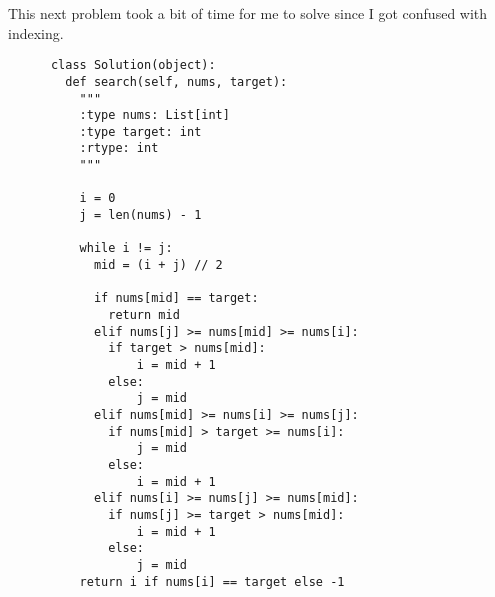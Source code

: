 \documentclass{article}
\begin{document}
  \begin{example}
    This next problem took a bit of time for me to solve since I got confused with indexing.   
    \begin{lstlisting}
      class Solution(object):
        def search(self, nums, target):
          """
          :type nums: List[int]
          :type target: int
          :rtype: int
          """

          i = 0 
          j = len(nums) - 1

          while i != j: 
            mid = (i + j) // 2 

            if nums[mid] == target: 
              return mid 
            elif nums[j] >= nums[mid] >= nums[i]: 
              if target > nums[mid]: 
                  i = mid + 1 
              else: 
                  j = mid
            elif nums[mid] >= nums[i] >= nums[j]: 
              if nums[mid] > target >= nums[i]: 
                  j = mid 
              else: 
                  i = mid + 1
            elif nums[i] >= nums[j] >= nums[mid]: 
              if nums[j] >= target > nums[mid]: 
                  i = mid + 1
              else: 
                  j = mid
          return i if nums[i] == target else -1
        \end{lstlisting}
  \end{example}
\end{document}
